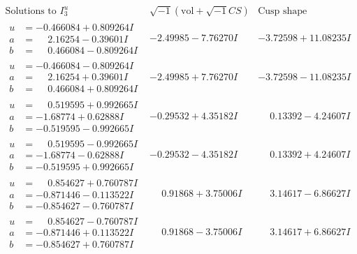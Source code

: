 \documentclass[1p]{elsarticle_modified}
\theoremstyle{definition}
\newcommand{\I}{\sqrt{-1}}
\begin{document}
$$\begin{array}{c|c|c}  
\text{Solutions to }I^u_{3}& \I (\text{vol} + \sqrt{-1}CS) & \text{Cusp shape}\\
 \hline 
\begin{aligned}
u &= -0.466084 + 0.809264 I \\
a &= \phantom{-}2.16254 - 0.39601 I \\
b &= \phantom{-}0.466084 - 0.809264 I\end{aligned}
 & -2.49985 - 7.76270 I & -3.72598 + 11.08235 I \\ \hline\begin{aligned}
u &= -0.466084 - 0.809264 I \\
a &= \phantom{-}2.16254 + 0.39601 I \\
b &= \phantom{-}0.466084 + 0.809264 I\end{aligned}
 & -2.49985 + 7.76270 I & -3.72598 - 11.08235 I \\ \hline\begin{aligned}
u &= \phantom{-}0.519595 + 0.992665 I \\
a &= -1.68774 + 0.62888 I \\
b &= -0.519595 - 0.992665 I\end{aligned}
 & -0.29532 + 4.35182 I & \phantom{-}0.13392 - 4.24607 I \\ \hline\begin{aligned}
u &= \phantom{-}0.519595 - 0.992665 I \\
a &= -1.68774 - 0.62888 I \\
b &= -0.519595 + 0.992665 I\end{aligned}
 & -0.29532 - 4.35182 I & \phantom{-}0.13392 + 4.24607 I \\ \hline\begin{aligned}
u &= \phantom{-}0.854627 + 0.760787 I \\
a &= -0.871446 - 0.113522 I \\
b &= -0.854627 - 0.760787 I\end{aligned}
 & \phantom{-}0.91868 + 3.75006 I & \phantom{-}3.14617 - 6.86627 I \\ \hline\begin{aligned}
u &= \phantom{-}0.854627 - 0.760787 I \\
a &= -0.871446 + 0.113522 I \\
b &= -0.854627 + 0.760787 I\end{aligned}
 & \phantom{-}0.91868 - 3.75006 I & \phantom{-}3.14617 + 6.86627 I \\ \hline\begin{aligned}

\end{aligned}
\end{array}$$
\end{document}
